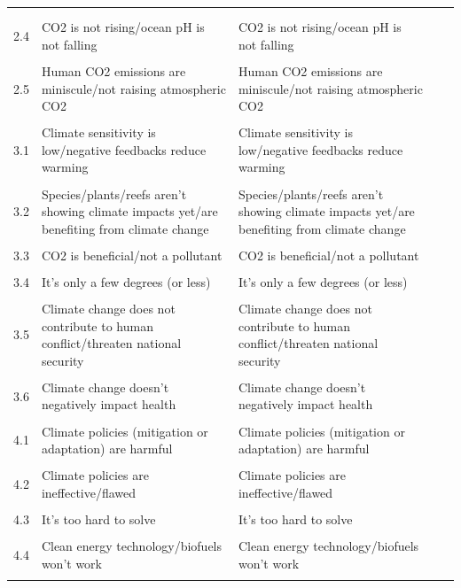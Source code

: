 \documentclass{article}
\begin{document}
\begin{longtable}{@{}lp{6.5cm}p{6.5cm}ll@{}}
   &
   \\ \\
2.4 &
  CO2 is not rising/ocean pH is not falling &
  CO2 is not rising/ocean pH is not falling &
   &
   \\ \\
2.5 &
  Human CO2 emissions are miniscule/not raising atmospheric CO2 &
  Human CO2 emissions are miniscule/not raising atmospheric CO2 &
   &
   \\ \\
3.1 &
  Climate sensitivity is low/negative feedbacks reduce warming &
  Climate sensitivity is low/negative feedbacks reduce warming &
   &
   \\ \\
3.2 &
  Species/plants/reefs aren't showing climate impacts yet/are   benefiting from climate change &
  Species/plants/reefs aren't showing climate impacts yet/are   benefiting from climate change &
   &
   \\ \\
3.3 &
  CO2 is beneficial/not a pollutant &
  CO2 is beneficial/not a pollutant &
   &
   \\ \\
3.4 &
  It's only a few degrees (or less) &
  It's only a few degrees (or less) &
   &
   \\ \\
3.5 &
  Climate change does not contribute to human conflict/threaten   national security &
  Climate change does not contribute to human conflict/threaten   national security &
   &
   \\ \\
3.6 &
  Climate change doesn't negatively impact health &
  Climate change doesn't negatively impact health &
   &
   \\ \\
4.1 &
  Climate policies (mitigation or adaptation) are harmful &
  Climate policies (mitigation or adaptation) are harmful &
   &
   \\ \\
4.2 &
  Climate policies are ineffective/flawed &
  Climate policies are ineffective/flawed &
   &
   \\ \\
4.3 &
  It's too hard to solve &
  It's too hard to solve &
   &
   \\ \\
4.4 &
  Clean energy technology/biofuels won't work &
  Clean energy technology/biofuels won't work &
   &
   \\ \\

\end{longtable}
\end{document}
